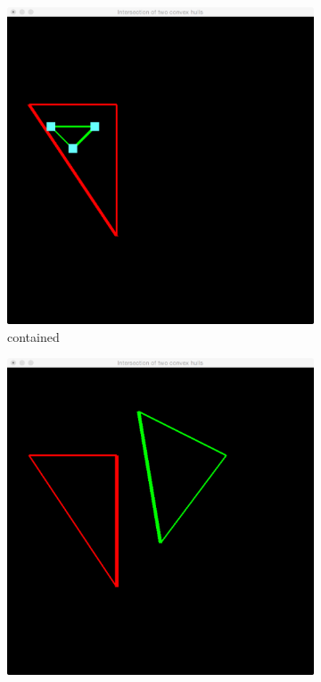	\begin{figure}
		\begin{subfigure}{0.3\textwidth}
			\includegraphics[width=\textwidth]{./img/a_contained_2}
			\caption{contained}
			\label{subfig:a:results:contained_2}			
		\end{subfigure}
		\begin{subfigure}{0.3\textwidth}
			\includegraphics[width=\textwidth]{./img/a_disjoint_2}

\end{subfigure}
\end{figure}
